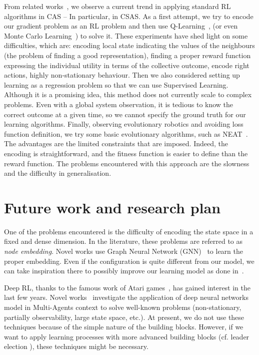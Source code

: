 \documentclass[conference]{IEEEtran}
\begin{document}
From related works~\cite{DAngelo2019}, we observe a current trend in applying standard RL algorithms in CAS -- In particular, in CSAS.
%
As a first attempt, we try to encode our gradient problem as an RL problem and then use Q-Learning~\cite{DBLP:journals/ras/Krose95}, (or even Monte Carlo Learning~\cite{DBLP:conf/nips/Thrun99}) to solve it.
%
These experiments have shed light on some difficulties, which are: encoding local state indicating the values of the neighbours (the problem of finding a good representation), finding a proper reward function expressing the individual utility in terms of the collective outcome, encode right actions, highly non-stationary behaviour. 
%
Then we also considered setting up learning as a regression problem so that we can use Supervised Learning.
% 
Although it is a promising idea, this method does not currently scale to complex problems.
%
Even with a global system observation, it is tedious to know the correct outcome at a given time, so we cannot specify the ground truth for our learning algorithms.
%
Finally, observing evolutionary robotics and avoiding loss function definition, we try some basic evolutionary algorithms, such as NEAT~\cite{DBLP:journals/ec/StanleyM02}.
%
The advantages are the limited constraints that are imposed. Indeed, the encoding is straightforward, and the fitness function is easier to define than the reward function.
%
The problems encountered with this approach are the slowness and the difficulty in generalisation.
%
\section{Future work and research plan}
One of the problems encountered is the difficulty of encoding the state space in a fixed and dense dimension. 
%
In the literature, these problems are referred to as \emph{node embedding}. 
%
Novel works use Graph Neural Network (GNN)~\cite{DBLP:journals/tnn/ScarselliGTHM09} to learn the proper embedding.
%
Even if the configuration is quite different from our model, we can take inspiration there to possibly improve our learning model as done in~\cite{DBLP:conf/nips/SukhbaatarSF16}.

Deep RL, thanks to the famous work of Atari games~\cite{DBLP:journals/corr/HosuR16}, has gained interest in the last few years. 
%
Novel works~\cite{DBLP:journals/aamas/Hernandez-LealK19} investigate the application of deep neural networks model in Multi-Agents context to solve well-known problems (non-stationary, partially observability, large state space, etc.). 
%
At present, we do not use these techniques because of the simple nature of the building blocks. However, if we want to apply learning processes with more advanced building blocks (cf. leader election ), these techniques might be necessary.
\end{document}
